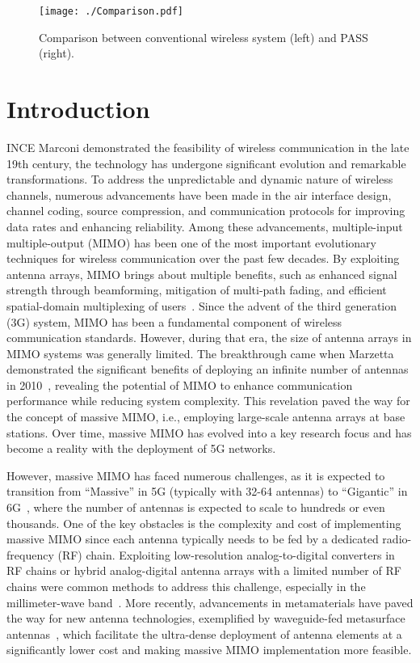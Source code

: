 
\begin{figure*}[t!]
    \centering
    \texttt{[image: ./Comparison.pdf]}
    \caption{Comparison between conventional wireless system (left) and PASS (right).}
    \label{comparison}
    \vspace{-0.5cm}
\end{figure*} 

\section{Introduction} \label{sec:intro}

INCE Marconi demonstrated the feasibility of wireless communication in the late 19th century, the technology has undergone significant evolution and remarkable transformations. To address the unpredictable and dynamic nature of wireless channels, numerous advancements have been made in the air interface design, channel coding, source compression, and communication protocols for improving data rates and enhancing reliability. Among these advancements, multiple-input multiple-output (MIMO) has been one of the most important evolutionary techniques for wireless communication over the past few decades. By exploiting antenna arrays, MIMO brings about multiple benefits, such as enhanced signal strength through beamforming, mitigation of multi-path fading, and efficient spatial-domain multiplexing of users~\cite{bjornson2023twenty}. Since the advent of the third generation (3G) system, MIMO has been a fundamental component of wireless communication standards. However, during that era, the size of antenna arrays in MIMO systems was generally limited. The breakthrough came when Marzetta demonstrated the significant benefits of deploying an infinite number of antennas in 2010~\cite{marzetta2010noncooperative}, revealing the potential of MIMO to enhance communication performance while reducing system complexity. This revelation paved the way for the concept of massive MIMO, i.e., employing large-scale antenna arrays at base stations. Over time, massive MIMO has evolved into a key research focus and has become a reality with the deployment of 5G networks. 


However, massive MIMO has faced numerous challenges, as it is expected to transition from “Massive” in 5G (typically with 32-64 antennas) to “Gigantic” in 6G~\cite{Xtext, bjornson2024enabling}, where the number of antennas is expected to scale to hundreds or even thousands. One of the key obstacles is the complexity and cost of implementing massive MIMO since each antenna typically needs to be fed by a dedicated radio-frequency (RF) chain. Exploiting low-resolution analog-to-digital converters in RF chains or hybrid analog-digital antenna arrays with a limited number of RF chains were common methods to address this challenge, especially in the millimeter-wave band~\cite{heath2016overview}. More recently, advancements in metamaterials have paved the way for new antenna technologies, exemplified by waveguide-fed metasurface antennas~\cite{smith2017analysis, shlezinger2021dynamic, di2024reconfigurable}, which facilitate the ultra-dense deployment of antenna elements at a significantly lower cost and making massive MIMO implementation more feasible.

